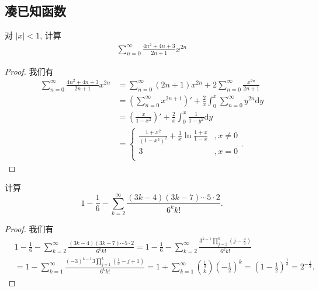 \documentclass[../../main.tex]{subfiles}
\begin{document}
\subsection{凑已知函数}

\begin{example}
对 \(|x| < 1\), 计算
\begin{align*}
\sum_{n=0}^{\infty} \frac{4n^2 + 4n + 3}{2n + 1} x^{2n}
\end{align*}
\end{example}
\begin{proof}
我们有
\begin{align*}
\sum_{n=0}^{\infty} \frac{4n^2 + 4n + 3}{2n + 1} x^{2n} &= \sum_{n=0}^{\infty} (2n + 1) x^{2n} + 2 \sum_{n=0}^{\infty} \frac{x^{2n}}{2n + 1} \\
&= \left( \sum_{n=0}^{\infty} x^{2n + 1} \right)' + \frac{2}{x} \int_{0}^{x} \sum_{n=0}^{\infty} y^{2n} \mathrm{d}y \\
&= \left( \frac{x}{1 - x^2} \right)' + \frac{2}{x} \int_{0}^{x} \frac{1}{1 - y^2} \mathrm{d}y \\
&=\begin{cases}
\frac{1+x^2}{(1-x^2)^2}+\frac{1}{x}\ln \frac{1+x}{1-x}&,x\ne 0\\
3&,x=0\\
\end{cases}.
\end{align*}

\end{proof}

\begin{example}
计算
\[
1 - \frac{1}{6} - \sum_{k=2}^{\infty} \frac{(3k - 4)(3k - 7) \cdots 5 \cdot 2}{6^k k!}.
\]
\end{example}
\begin{proof}
我们有
\begin{align*}
&1 - \frac{1}{6} - \sum_{k=2}^{\infty} \frac{(3k - 4)(3k - 7) \cdots 5 \cdot 2}{6^k k!}= 1 - \frac{1}{6} - \sum_{k=2}^{\infty} \frac{3^{k - 1} \prod\limits_{j=2}^{k} \left(j - \frac{4}{3}\right)}{6^k k!}\\
&= 1 - \sum_{k=1}^{\infty} \frac{(-3)^{k - 1} 3 \prod\limits_{j=1}^{k} \left(\frac{1}{3} - j + 1\right)}{6^k k!}= 1 + \sum_{k=1}^{\infty} \binom{\frac{1}{3}}{k} \left(-\frac{1}{2}\right)^k = \left(1 - \frac{1}{2}\right)^{\frac{1}{3}} = 2^{-\frac{1}{3}}.
\end{align*}

\end{proof}
\end{document}
